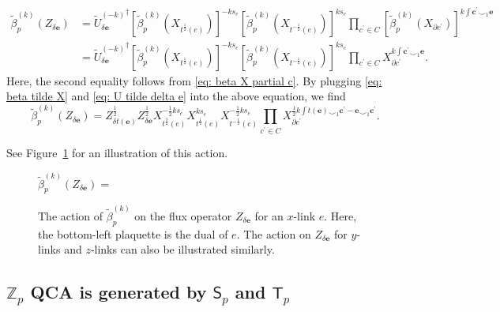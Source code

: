 \documentclass[aps,twocolumn,prx,floatfix,preprintnumbers, nofootinbib,10pt]{revtex4-2}
\numberwithin{equation}{section}
\theoremstyle{definition}
\theoremstyle{remark}
\theoremstyle{claim}
\renewcommand{\sf}[1]{\mathsf{#1}}
\begin{document}
\begin{widetext}
\begin{equation}
\begin{aligned}
\tilde{\beta}_p^{(k)}(Z_{\delta \bm{e}})
&= \left.\widetilde{U}_{\delta \bm{e}}^{(-k)}\right.^{\dagger} \left[\tilde{\beta}_p^{(k)}(X_{t^{\frac{1}{2}}(e)})\right]^{-ks_e} \left[\tilde{\beta}_p^{(k)}(X_{t^{-\frac{1}{2}}(e)})\right]^{ks_e} \prod_{c^{\prime} \in C} \left[\tilde{\beta}_p^{(k)}(X_{\partial c^{\prime}})\right]^{k \int \bm{c}^{\prime} \smile_1 \bm{e}} \\
&= \left.\widetilde{U}_{\delta \bm{e}}^{(-k)}\right.^{\dagger} \left[\tilde{\beta}_p^{(k)}(X_{t^{\frac{1}{2}}(e)})\right]^{-ks_e} \left[\tilde{\beta}_p^{(k)}(X_{t^{-\frac{1}{2}}(e)})\right]^{ks_e} \prod_{c^{\prime} \in C} X_{\partial c^{\prime}}^{k \int \bm{c}^{\prime} \smile_1 \bm{e}}.
\end{aligned}
\end{equation}
Here, the second equality follows from \eqref{eq: beta X partial c}.
By plugging \eqref{eq: beta tilde X} and \eqref{eq: U tilde delta e} into the above equation, we find
\begin{equation}
\tilde{\beta}_p^{(k)}(Z_{\delta \bm{e}}) = Z_{\delta t(\bm{e})}^{\frac{1}{2}} Z_{\delta \bm{e}}^{\frac{1}{2}} X_{t^{\frac{3}{2}}(e)}^{-\frac{1}{2}ks_e} X_{t^{\frac{1}{2}}(e)}^{ks_e} X_{t^{-\frac{1}{2}}(e)}^{-\frac{1}{2}ks_e} \prod_{c^{\prime} \in C} X_{\partial c^{\prime}}^{\frac{1}{2}k \int t(\bm{e}) \smile_1 \bm{c}^{\prime} - \bm{e} \smile_1 \bm{c}^{\prime}}.
\label{eq: beta tilde Z}
\end{equation}
\end{widetext}
See Figure~\ref{fig: beta tilde Z} for an illustration of this action.
\begin{figure}
\centering
$\tilde{\beta}_p^{(k)}(Z_{\delta \bm{e}}) =$
\caption{The action of $\tilde{\beta}_p^{(k)}$ on the flux operator $Z_{\delta \bm{e}}$ for an $x$-link $e$. Here, the bottom-left plaquette is the dual of $e$. The action on $Z_{\delta \bm{e}}$ for $y$-links and $z$-links can also be illustrated similarly.}
\label{fig: beta tilde Z}
\end{figure}




\subsection{$\mathbb{Z}_p$ QCA is generated by $\mathsf{S}_p$ and $\sf{T}_p$}
\label{sec: Zpk QCA generated by D and T}
\end{document}
